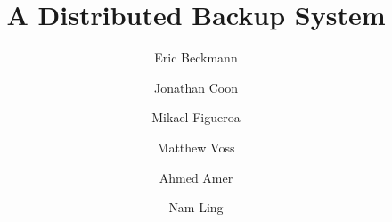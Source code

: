 \documentclass{scu-thesis}
\author{Eric Beckmann}
\author{Jonathan Coon}
\author{Mikael Figueroa}
\author{Matthew Voss}
\title{A Distributed Backup System}
\begin{document}
\frontmatter
\signature{Ahmed Amer}
\signature{Nam Ling}

\maketitle


\tableofcontents
\listoffigures

\mainmatter













\backmatter
\end{document}
